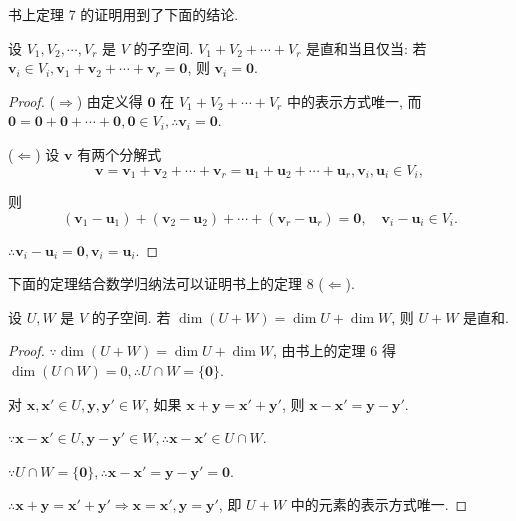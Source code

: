 \documentclass[color=black,device=normal,lang=cn,mode=geye]{elegantnote}
\begin{document}
书上定理 7 的证明用到了下面的结论.
\begin{theorem}
    设 $V_1,V_2,\cdots,V_r$ 是 $V$ 的子空间. $V_1+V_2+\cdots+V_r$ 是直和当且仅当: 若 $\boldsymbol{v}_i\in V_i,\boldsymbol{v}_1+\boldsymbol{v}_2+\cdots+\boldsymbol{v}_r=\boldsymbol{0}$, 则 $\boldsymbol{v}_i=\boldsymbol{0}$.
\end{theorem}
\begin{proof}
    ($\Rightarrow$) 由定义得 $\boldsymbol{0}$ 在 $V_1+V_2+\cdots+V_r$ 中的表示方式唯一, 而 $\boldsymbol{0}=\boldsymbol{0}+\boldsymbol{0}+\cdots+\boldsymbol{0},\boldsymbol{0}\in V_i,\therefore\boldsymbol{v}_i=\boldsymbol{0}$.

    ($\Leftarrow$) 设 $\boldsymbol{v}$ 有两个分解式
    \[\boldsymbol{v}=\boldsymbol{v}_1+\boldsymbol{v}_2+\cdots+\boldsymbol{v}_r=\boldsymbol{u}_1+\boldsymbol{u}_2+\cdots+\boldsymbol{u}_r,\boldsymbol{v}_i,\boldsymbol{u}_i\in V_i,\]

    则
    \[(\boldsymbol{v}_1-\boldsymbol{u}_1)+(\boldsymbol{v}_2-\boldsymbol{u}_2)+\cdots+(\boldsymbol{v}_r-\boldsymbol{u}_r)=\boldsymbol{0},\quad\boldsymbol{v}_i-\boldsymbol{u}_i\in V_i.\]

    $\therefore\boldsymbol{v}_i-\boldsymbol{u}_i=\boldsymbol{0},\boldsymbol{v}_i=\boldsymbol{u}_i$.
\end{proof}
下面的定理结合数学归纳法可以证明书上的定理 8 ($\Leftarrow$).
\begin{theorem}\label{t1.4}
    设 $U,W$ 是 $V$ 的子空间. 若 $\dim(U+W)=\dim U+\dim W$, 则 $U+W$ 是直和.
\end{theorem}
\begin{proof}
    $\because\dim(U+W)=\dim U+\dim W$, 由书上的定理 6 得 $\dim(U\cap W)=0,\therefore U\cap W=\{\boldsymbol{0}\}$.

    对 $\boldsymbol{x},\boldsymbol{x}'\in U,\boldsymbol{y},\boldsymbol{y}'\in W$, 如果 $\boldsymbol{x}+\boldsymbol{y}=\boldsymbol{x}'+\boldsymbol{y}'$, 则 $\boldsymbol{x}-\boldsymbol{x}'=\boldsymbol{y}-\boldsymbol{y}'$.

    $\because\boldsymbol{x}-\boldsymbol{x}'\in U,\boldsymbol{y}-\boldsymbol{y}'\in W,\therefore\boldsymbol{x}-\boldsymbol{x}'\in U\cap W$.

    $\because U\cap W=\{\boldsymbol{0}\},\therefore\boldsymbol{x}-\boldsymbol{x}'=\boldsymbol{y}-\boldsymbol{y}'=\boldsymbol{0}$.

    $\therefore\boldsymbol{x}+\boldsymbol{y}=\boldsymbol{x}'+\boldsymbol{y}'\Rightarrow\boldsymbol{x}=\boldsymbol{x}',\boldsymbol{y}=\boldsymbol{y}'$, 即 $U+W$ 中的元素的表示方式唯一.
\end{proof}
\end{document}

